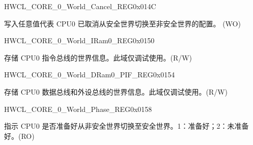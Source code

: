 \begin{register}{H}{WCL\_CORE\_0\_World\_Cancel\_REG}{0x014C}\label{regdesc:WCLCORE0WORLDCANCELREG}
%
\regnewline%
\begin{regdesc}\begin{reglist}
\label{fielddesc:WCLCORE0WORLDCANCEL}\item [WCL\_CORE\_0\_WORLD\_CANCEL] 写入任意值代表 CPU0 已取消从安全世界切换至非安全世界的配置。 (WO)
\end{reglist}\end{regdesc}
\end{register}


\begin{register}{H}{WCL\_CORE\_0\_World\_IRam0\_REG}{0x0150}\label{regdesc:WCLCORE0WORLDIRAM0REG}
%
%
\regnewline%
\begin{regdesc}\begin{reglist}
\label{fielddesc:WCLCORE0WORLDIRAM0}\item [WCL\_CORE\_0\_WORLD\_IRAM0] 存储 CPU0 指令总线的世界信息。此域仅调试使用。(R/W)
\end{reglist}\end{regdesc}
\end{register}


\begin{register}{H}{WCL\_CORE\_0\_World\_DRam0\_PIF\_REG}{0x0154}\label{regdesc:WCLCORE0WORLDDRAM0PIFREG}
%
%
\regnewline%
\begin{regdesc}\begin{reglist}
\label{fielddesc:WCLCORE0WORLDDRAM0PIF}\item [WCL\_CORE\_0\_WORLD\_DRAM0\_PIF] 存储 CPU0 数据总线和外设总线的世界信息。此域仅调试使用。(R/W)
\end{reglist}\end{regdesc}
\end{register}


\begin{register}{H}{WCL\_CORE\_0\_World\_Phase\_REG}{0x0158}\label{regdesc:WCLCORE0WORLDPHASEREG}
%
%
\regnewline%
\begin{regdesc}\begin{reglist}
\label{fielddesc:WCLCORE0WORLDPHASE}\item [WCL\_CORE\_0\_WORLD\_PHASE] 指示 CPU0 是否准备好从非安全世界切换至安全世界。1：准备好；2：未准备好。(RO)
\end{reglist}\end{regdesc}
\end{register}

